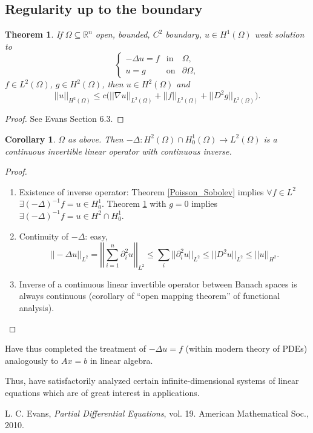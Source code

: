 \documentclass[12pt]{article}
\newtheorem{theorem}{Theorem}[section]
\newtheorem{corollary}{Corollary}[section]
\theoremstyle{definition}
\begin{document}
\subsection{Regularity up to the boundary}
\begin{theorem}\label{regular_H2}
If $\Omega\subseteq\mathbb{R}^n$ open, bounded, $C^2$ boundary, $u\in H^1(\Omega)$ weak solution to
\[\left\{\begin{array}{rcl}-\Delta u=f&\text{in}&\Omega,\\u=g&\text{on}&\partial\Omega,\end{array}\right.\]
$f\in L^2(\Omega)$, $g\in H^2(\Omega)$, then $u\in H^2(\Omega)$ and
\[||u||_{H^2(\Omega)}\leq c\big(||\nabla u||_{L^2(\Omega)}+||f||_{L^2(\Omega)}+||D^2g||_{L^2(\Omega)}\big).\]
\end{theorem}

\begin{proof}
See \cite{evans2010partial} Evans Section 6.3.
\end{proof}

\begin{corollary}
$\Omega$ as above. Then $-\Delta:H^2(\Omega)\cap H_0^1(\Omega)\rightarrow L^2(\Omega)$ is a continuous invertible linear operator with continuous inverse.
\end{corollary}

\begin{proof}
\begin{enumerate}[label=(\roman*)]
\item Existence of inverse operator: Theorem \ref{Poisson_Sobolev} implies $\forall f\in L^2$ $\exists(-\Delta)^{-1}f=u\in H_0^1$. Theorem \ref{regular_H2} with $g=0$ implies $\exists(-\Delta)^{-1}f=u\in H^2\cap H_0^1$.

\item Continuity of $-\Delta$: easy,
\[||-\Delta u||_{L^2}=\left|\left|\sum_{i=1}^n\partial_i^2u\right|\right|_{L^2}\leq\sum_i||\partial_i^2u||_{L^2}\leq||D^2u||_{L^2}\leq||u||_{H^2}.\]

\item Inverse of a continuous linear invertible operator between Banach spaces is always continuous (corollary of ``open mapping theorem'' of functional analysis).
\end{enumerate}
\end{proof}

Have thus completed the treatment of $-\Delta u=f$ (within modern theory of PDEs) analogously to $Ax=b$ in linear algebra.

Thus, have satisfactorily analyzed certain infinite-dimensional systems of linear equations which are of great interest in applications.

\begin{thebibliography}{1}
 L. C. Evans, \emph{Partial Differential Equations}, vol. 19. American Mathematical Soc., 2010.
\end{thebibliography}
\end{document}
